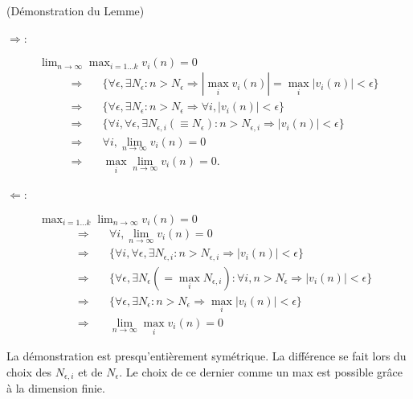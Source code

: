 \proof (Démonstration du Lemme)
\begin{description}
  \item[$\Rightarrow$:] $\lim_{n \to \infty} \max_{i=1 \dots k} v_i(n) = 0$
  \begin{align*}
    \Rightarrow \quad & \{\forall \epsilon, \exists N_\epsilon: n > N_\epsilon \Rightarrow |\max_i v_i(n)| = \max_i |v_i(n)| < \epsilon\} \\
    \Rightarrow \quad & \{\forall \epsilon, \exists N_\epsilon: n > N_\epsilon \Rightarrow \forall i, |v_i(n)| < \epsilon\} \\
    \Rightarrow \quad & \{\forall i, \forall \epsilon, \exists N_{\epsilon, i}(\equiv N_\epsilon): n > N_{\epsilon, i} \Rightarrow |v_i(n)| < \epsilon\} \\
    \Rightarrow \quad & \forall i, \lim_{n \to \infty} v_i(n) = 0 \\
    \Rightarrow \quad & \max_i \lim_{n \to \infty} v_i(n) = 0.
  \end{align*}
  \item[$\Leftarrow$:] $\max_{i=1 \dots k} \lim_{n \to \infty} v_i(n) = 0$
  \begin{align*}
    \Rightarrow \quad & \forall i, \lim_{n \to \infty} v_i(n) = 0 \\
    \Rightarrow \quad & \{\forall i, \forall \epsilon, \exists N_{\epsilon, i}: n > N_{\epsilon, i} \Rightarrow |v_i(n)| < \epsilon\}\\
    \Rightarrow \quad & \{\forall \epsilon, \exists N_\epsilon (= \max_i N_{\epsilon, i}): \forall i, n > N_\epsilon \Rightarrow |v_i(n)| < \epsilon\}\\
    \Rightarrow \quad & \{\forall \epsilon, \exists N_\epsilon: n > N_\epsilon \Rightarrow \max_i |v_i(n)| < \epsilon\}\\
    \Rightarrow \quad & \lim_{n \to \infty} \max_i v_i(n) = 0
  \end{align*}
\end{description}
La démonstration est presqu'entièrement symétrique. La différence se fait lors du choix des $N_{\epsilon, i}$ et de $N_\epsilon$. Le choix de ce dernier comme un max est possible grâce à la dimension finie.
\eproof

